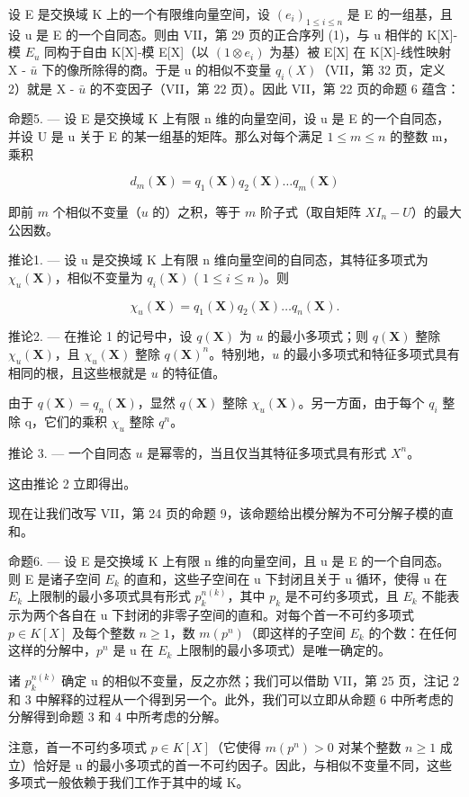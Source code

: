 设 E 是交换域 K 上的一个有限维向量空间，设 \((e_{i})_{1 \leq i \leq n}\) 是 E 的一组基，且设 u 是 E 的一个自同态。则由 VII，第 29 页的正合序列 (1)，与 u 相伴的 K{[}X{]}-模 \(E_{u}\) 同构于自由 K{[}X{]}-模 E{[}X{]}（以 \((1 \otimes e_{i})\) 为基）被 E{[}X{]} 在 K{[}X{]}-线性映射 X - \(\bar{u}\) 下的像所除得的商。于是 u 的相似不变量 \(q_{i}(X)\)（VII，第 32 页，定义 2）就是 X - \(\bar{u}\) 的不变因子（VII，第 22 页）。因此 VII，第 22 页的命题 6 蕴含：

命题5. --- 设 E 是交换域 K 上有限 n 维的向量空间，设 u 是 E 的一个自同态，并设 U 是 u 关于 E 的某一组基的矩阵。那么对每个满足 \(1 \leq m \leq n\) 的整数 m，乘积

\[
d _ {m} (\mathbf {X}) = q _ {1} (\mathbf {X}) q _ {2} (\mathbf {X}) \dots q _ {m} (\mathbf {X})
\]

即前 \(m\) 个相似不变量（\(u\) 的）之积，等于 \(m\) 阶子式（取自矩阵 \(XI_{n} - U\)）的最大公因数。

推论1. --- 设 u 是交换域 K 上有限 n 维向量空间的自同态，其特征多项式为 \(\chi_{u}(\mathbf{X})\)，相似不变量为 \(q_{i}(\mathbf{X})\) ( \(1 \leqslant i \leqslant n\) )。则

\[
\chi_ {u} (\mathbf {X}) = q _ {1} (\mathbf {X}) q _ {2} (\mathbf {X}) \dots q _ {n} (\mathbf {X}).
\]

推论2. --- 在推论 1 的记号中，设 \(q(\mathbf{X})\) 为 \(u\) 的最小多项式；则 \(q(\mathbf{X})\) 整除 \(\chi_u(\mathbf{X})\)，且 \(\chi_u(\mathbf{X})\) 整除 \(q(\mathbf{X})^n\)。特别地，\(u\) 的最小多项式和特征多项式具有相同的根，且这些根就是 \(u\) 的特征值。

由于 \(q(\mathbf{X}) = q_{n}(\mathbf{X})\)，显然 \(q(\mathbf{X})\) 整除 \(\chi_{u}(\mathbf{X})\)。另一方面，由于每个 \(q_{i}\) 整除 q，它们的乘积 \(\chi_{u}\) 整除 \(q^{n}\)。

推论 3. --- 一个自同态 \(u\) 是幂零的，当且仅当其特征多项式具有形式 \(X^n\)。

这由推论 2 立即得出。

现在让我们改写 VII，第 24 页的命题 9，该命题给出模分解为不可分解子模的直和。

命题6. --- 设 E 是交换域 K 上有限 n 维的向量空间，且 u 是 E 的一个自同态。则 E 是诸子空间 \(E_{k}\) 的直和，这些子空间在 u 下封闭且关于 u 循环，使得 u 在 \(E_{k}\) 上限制的最小多项式具有形式 \(p_{k}^{n(k)}\)，其中 \(p_{k}\) 是不可约多项式，且 \(E_{k}\) 不能表示为两个各自在 u 下封闭的非零子空间的直和。对每个首一不可约多项式 \(p \in K[X]\) 及每个整数 \(n \geqslant 1\)，数 \(m(p^{n})\)（即这样的子空间 \(E_{k}\) 的个数：在任何这样的分解中，\(p^{n}\) 是 u 在 \(E_{k}\) 上限制的最小多项式）是唯一确定的。

诸 \(p_{k}^{n(k)}\) 确定 u 的相似不变量，反之亦然；我们可以借助 VII，第 25 页，注记 2 和 3 中解释的过程从一个得到另一个。此外，我们可以立即从命题 6 中所考虑的分解得到命题 3 和 4 中所考虑的分解。

注意，首一不可约多项式 \(p \in K[X]\)（它使得 \(m(p^{n}) > 0\) 对某个整数 \(n \geqslant 1\) 成立）恰好是 u 的最小多项式的首一不可约因子。因此，与相似不变量不同，这些多项式一般依赖于我们工作于其中的域 K。

